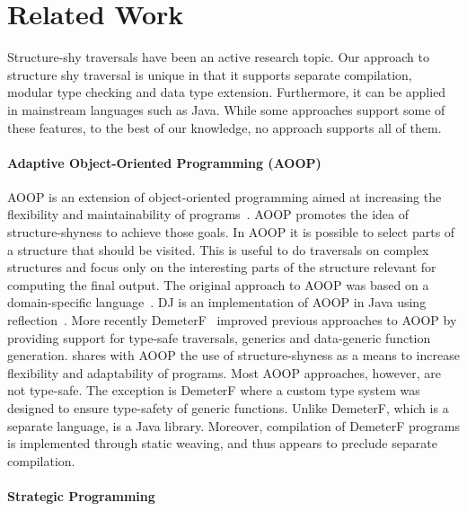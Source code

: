 \section{Related Work}\label{sec:related}


Structure-shy traversals have been an active research topic.  Our
approach to structure shy traversal is unique in that it supports
separate compilation, modular type checking and data type
extension. Furthermore, it can be applied in mainstream languages such
as Java. While some approaches support some of these features, to the
best of our knowledge, no approach supports all of them.  

\paragraph{Adaptive Object-Oriented Programming (AOOP)}
AOOP is an extension of object-oriented programming
aimed at increasing the flexibility and maintainability of
programs~\cite{DemeterBook}. AOOP promotes the idea of structure-shyness to achieve those
goals. In AOOP it is possible to select parts of a structure that
should be visited. This is useful to do traversals on complex
structures and focus only on the interesting parts of the structure
relevant for computing the final output. The original approach to AOOP
was based on a domain-specific language~\cite{DemeterBook}. DJ is an
implementation of AOOP in Java using reflection~\cite{DJ}. More
recently DemeterF~\cite{OOGP} improved previous approaches to AOOP by
providing support for type-safe traversals, generics and data-generic
function generation. \name shares with AOOP the use of
structure-shyness as a means to increase flexibility and adaptability
of programs.  Most AOOP approaches, however, are not type-safe. The
exception is DemeterF where a custom type system was designed to
ensure type-safety of generic functions. Unlike DemeterF, which is a
separate language, \name is a Java library.  Moreover, compilation of
DemeterF programs is implemented through static weaving, and thus appears to
preclude separate compilation.

\paragraph{Strategic Programming}

